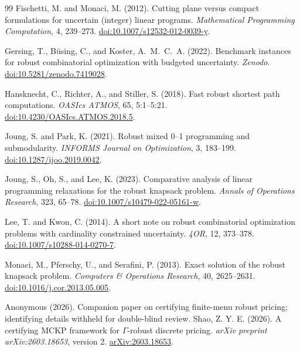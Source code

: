 \documentclass[11pt]{article}
\theoremstyle{plain}
\theoremstyle{definition}
\theoremstyle{remark}
\begin{document}
\begin{thebibliography}{99}
Fischetti, M. and Monaci, M. (2012).
\newblock Cutting plane versus compact formulations for uncertain (integer) linear programs.
\newblock \emph{Mathematical Programming Computation}, 4, 239--273.
\newblock \href{https://doi.org/10.1007/s12532-012-0039-y}{doi:10.1007/s12532-012-0039-y}.

Gersing, T., B\"using, C., and Koster, A.~M.~C.~A. (2022).
\newblock Benchmark instances for robust combinatorial optimization with budgeted uncertainty.
\newblock \emph{Zenodo}.
\newblock \href{https://doi.org/10.5281/zenodo.7419028}{doi:10.5281/zenodo.7419028}.

Hansknecht, C., Richter, A., and Stiller, S. (2018).
\newblock Fast robust shortest path computations.
\newblock \emph{OASIcs ATMOS}, 65, 5:1--5:21.
\newblock \href{https://doi.org/10.4230/OASIcs.ATMOS.2018.5}{doi:10.4230/OASIcs.ATMOS.2018.5}.

Joung, S. and Park, K. (2021).
\newblock Robust mixed 0--1 programming and submodularity.
\newblock \emph{INFORMS Journal on Optimization}, 3, 183--199.
\newblock \href{https://doi.org/10.1287/ijoo.2019.0042}{doi:10.1287/ijoo.2019.0042}.

Joung, S., Oh, S., and Lee, K. (2023).
\newblock Comparative analysis of linear programming relaxations for the robust knapsack problem.
\newblock \emph{Annals of Operations Research}, 323, 65--78.
\newblock \href{https://doi.org/10.1007/s10479-022-05161-w}{doi:10.1007/s10479-022-05161-w}.

Lee, T. and Kwon, C. (2014).
\newblock A short note on robust combinatorial optimization problems with cardinality constrained uncertainty.
\newblock \emph{4OR}, 12, 373--378.
\newblock \href{https://doi.org/10.1007/s10288-014-0270-7}{doi:10.1007/s10288-014-0270-7}.

Monaci, M., Pferschy, U., and Serafini, P. (2013).
\newblock Exact solution of the robust knapsack problem.
\newblock \emph{Computers \& Operations Research}, 40, 2625--2631.
\newblock \href{https://doi.org/10.1016/j.cor.2013.05.005}{doi:10.1016/j.cor.2013.05.005}.

\ifblind
{}
Anonymous (2026).
\newblock Companion paper on certifying finite-menu robust pricing; identifying details withheld for double-blind review.
\else
{}
Shao, Z. Y. E. (2026).
\newblock A certifying MCKP framework for $\Gamma$-robust discrete pricing.
\newblock \emph{arXiv preprint arXiv:2603.18653}, version 2.
\newblock \href{https://arxiv.org/abs/2603.18653}{arXiv:2603.18653}.
\fi


\end{thebibliography}
\end{document}
